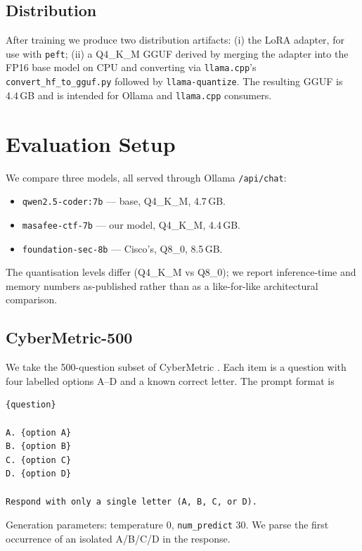 \documentclass[10pt,twocolumn,a4paper]{article}
\begin{document}
\subsection{Distribution}

After training we produce two distribution artifacts: (i) the LoRA adapter, for use with \texttt{peft}; (ii) a Q4{\_}K{\_}M GGUF derived by merging the adapter into the FP16 base model on CPU and converting via \texttt{llama.cpp}'s \texttt{convert\_hf\_to\_gguf.py} followed by \texttt{llama-quantize}. The resulting GGUF is 4.4\,GB and is intended for Ollama and \texttt{llama.cpp} consumers.

\section{Evaluation Setup}

We compare three models, all served through Ollama \texttt{/api/chat}:

\begin{itemize}
\item \texttt{qwen2.5-coder:7b} --- base, Q4{\_}K{\_}M, 4.7\,GB.
\item \texttt{masafee-ctf-7b} --- our model, Q4{\_}K{\_}M, 4.4\,GB.
\item \texttt{foundation-sec-8b} --- Cisco's, Q8{\_}0, 8.5\,GB.
\end{itemize}

The quantisation levels differ (Q4{\_}K{\_}M vs Q8{\_}0); we report inference-time and memory numbers as-published rather than as a like-for-like architectural comparison.

\subsection{CyberMetric-500}

We take the 500-question subset of CyberMetric \cite{tihanyi2024cybermetric}. Each item is a question with four labelled options A--D and a known correct letter. The prompt format is

\begin{lstlisting}
{question}

A. {option A}
B. {option B}
C. {option C}
D. {option D}

Respond with only a single letter (A, B, C, or D).
\end{lstlisting}

Generation parameters: temperature 0, \texttt{num\_predict} 30. We parse the first occurrence of an isolated A/B/C/D in the response.
\end{document}
